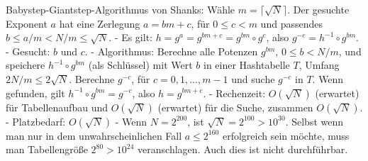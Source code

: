 \documentclass[a4paper]{article}
\begin{document}
\begin{multicols}{3}
{{{{Babystep-Giantstep-Algorithmus von Shanks: 
Wähle $m=\lceil \sqrt{N}\rceil$. Der gesuchte Exponent $a$ hat eine Zerlegung $a=bm+c$, für $0\leq c < m$ und passendes $b\leq a/m < N/m\leq \sqrt{N}$. 
- Es gilt: $h=g^a=g^{bm+c}=g^{bm} \circ g^c$, also $g^{-c}=h^{-1}\circ g^{bm}$.
- Gesucht: $b$ und $c$.
- Algorithmus: Berechne alle Potenzen $g^{bm}$, $0\leq b < N/m$, und speichere $h^{-1}\circ g^{bm}$ (als Schlüssel) mit Wert $b$ in einer Hashtabelle $T$, Umfang $2N/m\leq 2\sqrt{N}$. Berechne $g^{-c}$, für $c=0,1,...,m-1$ und suche $g^{-c}$ in $T$. Wenn gefunden, gilt $h^{-1} \circ g^{bm}=g^{-c}$, also $h=g^{bm+c}$.
- Rechenzeit: $O(\sqrt{N})$ (erwartet) für Tabellenaufbau und $O(\sqrt{N})$ (erwartet) für die Suche, zusammen $O(\sqrt{N})$. 
- Platzbedarf: $O(\sqrt{N})$
- Wenn $N=2^{200}$, ist $\sqrt{N}= 2^{100}> 10^{30}$. Selbst wenn man nur in dem unwahrscheinlichen Fall $a\leq 2^{160}$ erfolgreich sein möchte, muss man Tabellengröße $2^{80}> 10^{24}$ veranschlagen. Auch dies ist nicht durchführbar.

}}}}
\end{multicols}
\end{document}
